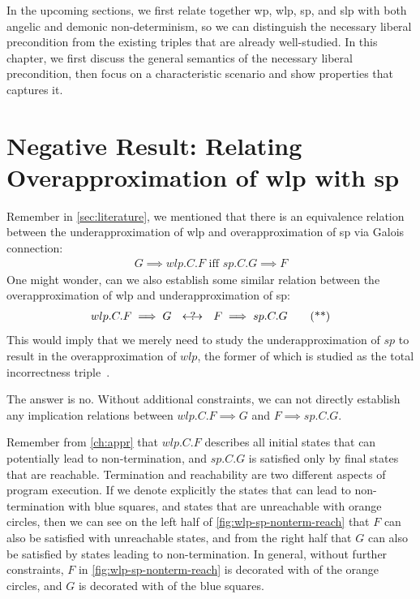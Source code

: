In the upcoming sections, we first relate together wp, wlp, sp, and slp with both angelic and demonic non-determinism, so we can distinguish the necessary liberal precondition from the existing triples that are already well-studied. 
In this chapter, we first discuss the general semantics of the necessary liberal precondition, then focus on a characteristic scenario and show properties that captures it. 

\section{Negative Result: Relating Overapproximation of wlp with sp}\label{sec:negative}
Remember in \autoref{sec:literature}, we mentioned that there is an equivalence relation between the underapproximation of wlp and overapproximation of sp via Galois connection: 
\begin{align}
	G\implies wlp.C.F\text{ iff }sp.C.G\implies F \tag{*}
\end{align}
One might wonder, can we also establish some similar relation between the overapproximation of wlp and underapproximation of sp:  
\begin{align}
	wlp.C.F \implies G\ \  \rlap{\(\quad?\)}\longleftrightarrow \ \ F\implies sp.C.G \tag{**}
\end{align}
This would imply that we merely need to study the underapproximation of $sp$ to result in the overapproximation of $wlp$, the former of which is studied as the total incorrectness triple~\cite{ohearn2020IncorrectnessLogic}. 

The answer is no. 
Without additional constraints, we can not directly establish any implication relations between $wlp.C.F\implies G$ and $F\implies sp.C.G$. 

Remember from \autoref{ch:appr} that $wlp.C.F$ describes all initial states that can potentially lead to non-termination, and $sp.C.G$ is satisfied only by final states that are reachable. 
Termination and reachability are two different aspects of program execution. 
If we denote explicitly the states that can lead to non-termination with blue squares, and states that are unreachable with orange circles, then we can see on the left half of \autoref{fig:wlp-sp-nonterm-reach} that $F$ can also be satisfied with unreachable states, and from the right half that $G$ can also be satisfied by states leading to non-termination.
In general, without further constraints, $F$ in \autoref{fig:wlp-sp-nonterm-reach} is decorated with  of the orange circles, and $G$ is decorated with  of the blue squares. 


